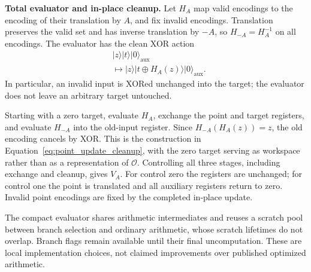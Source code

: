 \begin{revision}
\textbf{Total evaluator and in-place cleanup.}
Let $H_A$ map valid encodings to the encoding of their translation by
$A$, and fix invalid encodings. Translation preserves the valid set and
has inverse translation by $-A$, so $H_{-A}=H_A^{-1}$ on all encodings.
The evaluator has the clean XOR action
\begin{equation}
\label{eq:app_r5_total_point_evaluator}
\begin{aligned}
&\lvert z\rangle\lvert t\rangle
 \lvert0\rangle_{\mathrm{aux}}\\
&\longmapsto
 \lvert z\rangle\lvert t\oplus H_A(z)\rangle
 \lvert0\rangle_{\mathrm{aux}}.
\end{aligned}
\end{equation}
In particular, an invalid input is XORed unchanged into the target;
the evaluator does not leave an arbitrary target untouched.

Starting with a zero target, evaluate $H_A$, exchange the point and
target registers, and evaluate $H_{-A}$ into the old-input register.
Since $H_{-A}(H_A(z))=z$, the old encoding cancels by XOR. This is
the construction in Equation~\eqref{eq:point_update_cleanup}, with
the zero target serving as workspace rather than as a representation
of $\mathcal O$. Controlling all three stages, including exchange and
cleanup, gives $V_A$. For control zero the registers are unchanged;
for control one the point is translated and all auxiliary registers
return to zero. Invalid point encodings are fixed by the completed
in-place update.

The compact evaluator shares arithmetic intermediates and reuses a
scratch pool between branch selection and ordinary arithmetic, whose
scratch lifetimes do not overlap. Branch flags remain available until
their final uncomputation. These are local implementation choices,
not claimed improvements over published optimized arithmetic.
\end{revision}

